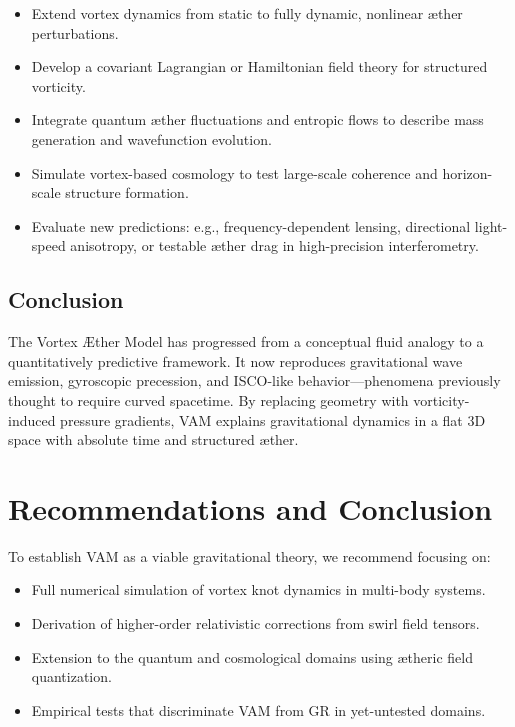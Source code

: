 \documentclass[a4paper, aps,preprint,superscriptaddress, 12pt]{revtex4}
\begin{document}
\begin{itemize}
    \item Extend vortex dynamics from static to fully dynamic, nonlinear æther perturbations.
    \item Develop a covariant Lagrangian or Hamiltonian field theory for structured vorticity.
    \item Integrate quantum æther fluctuations and entropic flows to describe mass generation and wavefunction evolution.
    \item Simulate vortex-based cosmology to test large-scale coherence and horizon-scale structure formation.
    \item Evaluate new predictions: e.g., frequency-dependent lensing, directional light-speed anisotropy, or testable æther drag in high-precision interferometry.
\end{itemize}

\subsection*{Conclusion}

The Vortex Æther Model has progressed from a conceptual fluid analogy to a quantitatively predictive framework. It now reproduces gravitational wave emission, gyroscopic precession, and ISCO-like behavior—phenomena previously thought to require curved spacetime. By replacing geometry with vorticity-induced pressure gradients, VAM explains gravitational dynamics in a flat 3D space with absolute time and structured æther.

\section{Recommendations and Conclusion}

To establish VAM as a viable gravitational theory, we recommend focusing on:
\begin{itemize}
    \item Full numerical simulation of vortex knot dynamics in multi-body systems.
    \item Derivation of higher-order relativistic corrections from swirl field tensors.
    \item Extension to the quantum and cosmological domains using ætheric field quantization.
    \item Empirical tests that discriminate VAM from GR in yet-untested domains.
\end{itemize}
\end{document}
